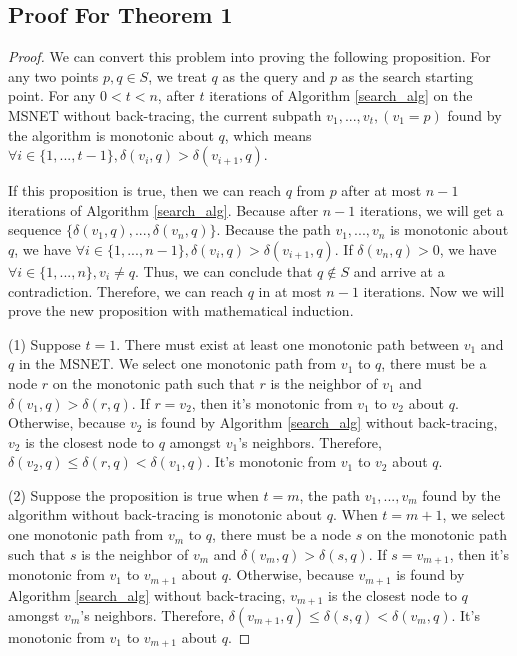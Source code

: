 \documentclass{vldb}
\begin{document}
\clearpage
\begin{appendix}
\section{Proof For Theorem 1}
\begin{proof}
We can convert this problem into proving the following proposition. For any two points $p,q\in S$, we treat $q$ as the query and $p$ as the search starting point. For any $0<t<n$, after $t$ iterations of Algorithm \ref{search_alg} on the MSNET without back-tracing, the current subpath $v_1, ... , v_t, (v_1 = p)$ found by the algorithm is monotonic about $q$, which means $\forall{i}\in \{1,...,t-1\}, \delta(v_i, q) > \delta(v_{i+1}, q)$.

 If this proposition is true, then we can reach $q$ from $p$ after at most $n-1$ iterations of Algorithm \ref{search_alg}. Because after $n-1$ iterations, we will get a sequence $\{\delta(v_1,q),..., \delta(v_{n},q)\}$. Because the path $v_1, ... , v_{n}$ is monotonic about $q$, we have $\forall{i}\in \{1,...,n-1\}, \delta(v_i,q) > \delta(v_{i+1},q)$. If $\delta(v_{n},q) > 0$, we have $\forall{i}\in \{1,...,n\}, v_i \ne q$. Thus, we can conclude that $q \notin S$ and arrive at a contradiction. Therefore, we can reach $q$ in at most $n-1$ iterations. 
Now we will prove the new proposition with mathematical induction.

(1) Suppose $t=1$. There must exist at least one monotonic path between $v_1$ and $q$ in the MSNET. We select one monotonic path from $v_1$ to $q$, there must be a node $r$ on the monotonic path such that $r$ is the neighbor of $v_1$ and $\delta(v_1, q) > \delta(r, q)$. If $r = v_2$, then it's monotonic from $v_1$ to $v_2$ about $q$. Otherwise, because $v_2$ is found by Algorithm \ref{search_alg} without back-tracing, $v_2$ is the closest node to $q$ amongst $v_1$'s neighbors. Therefore, $\delta(v_2, q) \le \delta(r, q) < \delta(v_1,q)$. It's monotonic from $v_1$ to $v_2$ about $q$. 

(2) Suppose the proposition is true when $t=m$, the path $v_1, ... , v_{m}$ found by the algorithm without back-tracing is monotonic about $q$. When $t=m+1$, we select one monotonic path from $v_m$ to $q$, there must be a node $s$ on the monotonic path such that $s$ is the neighbor of $v_m$ and $\delta(v_m, q) > \delta(s, q)$. If $s = v_{m+1}$, then it's monotonic from $v_1$ to $v_{m+1}$ about $q$. Otherwise, because $v_{m+1}$ is found by Algorithm \ref{search_alg} without back-tracing, $v_{m+1}$ is the closest node to $q$ amongst $v_m$'s neighbors. Therefore, $\delta(v_{m+1}, q) \le \delta(s, q) < \delta(v_m,q)$. It's monotonic from $v_1$ to $v_{m+1}$ about $q$. 


\end{proof}
\end{appendix}
\end{document}

